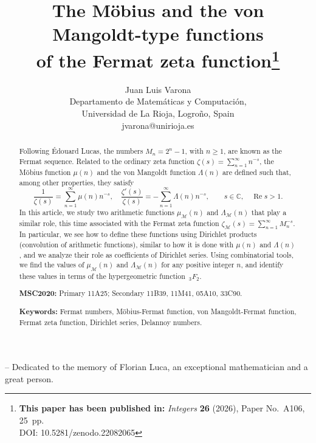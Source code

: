 \documentclass[11pt, a4paper]{article}
\title{The M\"obius and the von Mangoldt-type functions\\
of the Fermat zeta function\thanks{\textbf{This paper has been published in:}
\textit{Integers} \textbf{26} (2026), Paper No.~A106, 25~pp.\\ 
DOI: 10.5281/zenodo.22082065}}
\author{Juan Luis Varona\\[4pt]
\small Departamento de Matem\'aticas y Computaci\'on,\\ 
\small Universidad de La Rioja, Logro\~no, Spain\\
\small \textsf{jvarona@unirioja.es}}
\date{}     %
\newcommand{\C}{\mathbb{C}}
\renewcommand{\Re}{\operatorname{Re}}
\newcommand{\calM}{\mathcal{M}}
\theoremstyle{plain}
\theoremstyle{definition}
\begin{document}

\maketitle

\begin{abstract}
Following \'Edouard Lucas, the numbers $M_n = 2^n-1$, with $n \ge 1$, 
are known as the Fermat sequence.
Related to the ordinary zeta function $\zeta(s) = \sum_{n=1}^{\infty} n^{-s}$,
the M\"obius function $\mu(n)$ and the von Mangoldt function $\Lambda(n)$ are defined such that, among other properties, they satisfy
\[
\frac{1}{\zeta(s)} = \sum_{n=1}^{\infty} \mu(n)n^{-s},
\quad
\frac{\zeta'(s)}{\zeta(s)} = -\sum_{n=1}^{\infty} \Lambda(n)n^{-s},
\qquad s\in \C, \quad \Re s>1.
\]
In this article, we study two arithmetic functions $\mu_{\calM}(n)$ and $\Lambda_{\calM}(n)$ that play a similar role, this time associated with the Fermat zeta function $\zeta_{\calM}(s) = \sum_{n=1}^{\infty} M_n^{-s}$. 
In particular, we see how to define these functions using Dirichlet products (convolution of arithmetic functions), similar to how it is done with $\mu(n)$ and $\Lambda(n)$, and we analyze their role as coefficients of Dirichlet series.
Using combinatorial tools, we find the values of $\mu_{\calM}(n)$ and $\Lambda_{\calM}(n)$ for any positive integer $n$, and identify these values in terms of the hypergeometric function~${}_3F_2$.

\medskip

\textbf{MSC2020:} Primary 11A25; Secondary 11B39, 11M41, 05A10, 33C90.

\smallskip

\textbf{Keywords:} Fermat numbers, M\"obius-Fermat function, von Mangoldt-Fermat function, Fermat zeta function, Dirichlet series, Delannoy numbers.
\end{abstract}

\smallskip
\begin{flushright}
\itshape
\parbox{0.66\textwidth}{-- Dedicated to the memory of Florian Luca,
an exceptional mathematician and a great person.}
\end{flushright}
\smallskip
\end{document}
